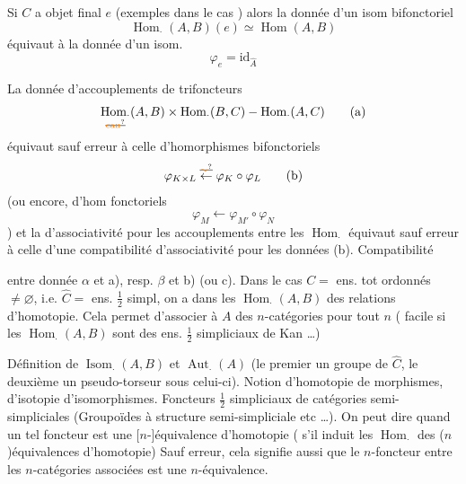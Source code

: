 Si $C$ a objet final $e$ (exemples dans le cas )
alors la donnée d'un isom bifonctoriel
\[
\operatorname{Hom}_{\cdot}(A,B)(e)\simeq\operatorname{Hom}(A,B)\tag*{($\alpha$)}
\]
équivaut à la donnée d'un isom.
\[
\varphi_e=\mathrm{id}_{\widehat A}\tag*{($\beta$)}
\]

La donnée d'accouplements de trifoncteurs
\[
\underset{\deleted{\unsure{\rm can}}}{\operatorname{Hom}_{\cdot}}(A,B)\times\operatorname{Hom}_{\cdot}(B,C)\mathbin{-}\operatorname{Hom}_{\cdot}(A,C)\tag*{(a)}
\]
équivaut sauf erreur à celle d'homorphismes
bifonctoriels
\[
\varphi_{K\times L}\mathrel{\overset{\deleted{\unsure{\sim}}}{\leftarrow}}\varphi_K\circ\varphi_L\tag*{(b)}
\]
(ou encore, d'hom fonctoriels
\[
\varphi_M\longleftarrow\varphi_{M'}\circ\varphi_N\tag*{(c)}
\]
)
et la   d'associativité  pour
les accouplements entre les $\operatorname{Hom}_{\cdot}$ équivaut
sauf erreur à celle d'une  compatibilité
d'associativité pour les données (b). Compatibilité

entre donnée $\alpha$ et a), resp. $\beta$ et b) (ou c).
Dans le cas $C=$ ens. tot ordonnés $\ne\varnothing$, i.e. $\widehat C=$ ens. $\frac12$ simpl,
on a dans les $\operatorname{Hom}_{\cdot}(A,B)$ des relations d'homotopie.
Cela permet d'associer à $A$ des $n$-catégories pour tout $n$
( facile si les $\operatorname{Hom}_{\cdot}(A,B)$ sont des ens. $\frac12$ simpliciaux
de Kan \ldots)

 Définition de $\operatorname{Isom}_{\cdot}(A,B)$ et $\operatorname{Aut}_{\cdot}(A)$ (le premier
un groupe de $\widehat C$, le deuxième un pseudo-torseur sous
celui-ci). Notion d'homotopie de morphismes, d'isotopie
d'isomorphismes. Foncteurs  $\frac12$ simpliciaux de
catégories  semi-simpliciales  (Groupoïdes à structure
semi-simpliciale etc \ldots). On peut dire quand un
tel foncteur est une [$n$-]équivalence d'homotopie (
s'il induit  les $\operatorname{Hom}_{\cdot}$ des ($n$)équivalences d'homotopie)
Sauf erreur, cela signifie aussi que le $n$-foncteur
entre les $n$-catégories associées est une $n$-équivalence.

